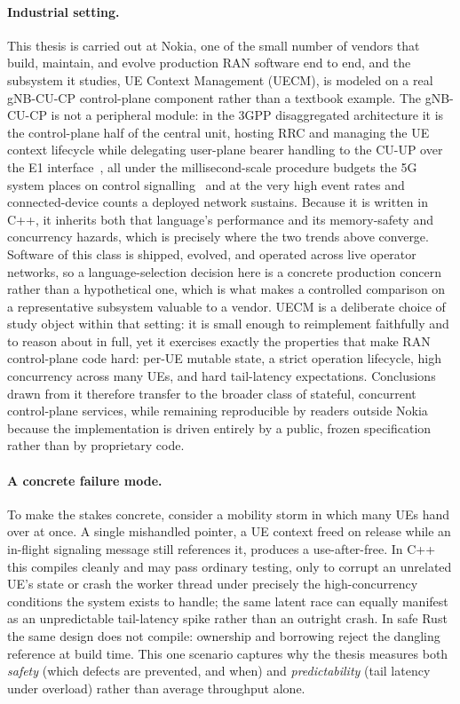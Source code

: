 \documentclass[english,twoside,openright,a4paper,censored,csm,software-track-2020]{HYthesisML}
\begin{document}
\paragraph{Industrial setting.}
This thesis is carried out at Nokia, one of the small number of vendors that build, maintain,
and evolve production RAN software end to end, and the subsystem it studies, UE Context
Management (UECM), is modeled on a real gNB-CU-CP control-plane component rather than a
textbook example. The gNB-CU-CP is not a peripheral module: in the 3GPP disaggregated
architecture it is the control-plane half of the central unit, hosting RRC and managing the
UE context lifecycle while delegating user-plane bearer handling to the CU-UP over the E1
interface~\cite{3gpp38401,3gpp38300,3gpp38463,3gpp38331}, all under the millisecond-scale
procedure budgets the 5G system places on control signalling~\cite{3gpp22261} and at the very
high event rates and connected-device counts a deployed network sustains. Because it is
written in C++, it inherits both that language's performance and its memory-safety and
concurrency hazards, which is precisely where the two trends above converge. Software of
this class is shipped, evolved, and operated across live operator networks, so a
language-selection decision here is a concrete production concern rather than a hypothetical
one, which is what makes a controlled comparison on a representative subsystem valuable to a
vendor. UECM is a deliberate choice of study object within that setting: it is small enough to
reimplement faithfully and to reason about in full, yet it exercises exactly the properties
that make RAN control-plane code hard: per-UE mutable state, a strict operation lifecycle,
high concurrency across many UEs, and hard tail-latency expectations. Conclusions drawn from
it therefore transfer to the broader class of stateful, concurrent control-plane services,
while remaining reproducible by readers outside Nokia because the implementation is driven
entirely by a public, frozen specification rather than by proprietary code.

\paragraph{A concrete failure mode.}
To make the stakes concrete, consider a mobility storm in which many UEs hand over at once. A
single mishandled pointer, a UE context freed on release while an in-flight signaling message
still references it, produces a use-after-free. In C++ this compiles cleanly and may pass
ordinary testing, only to corrupt an unrelated UE's state or crash the worker thread under
precisely the high-concurrency conditions the system exists to handle; the same latent race
can equally manifest as an unpredictable tail-latency spike rather than an outright crash. In
safe Rust the same design does not compile: ownership and borrowing reject the dangling
reference at build time. This one scenario captures why the thesis measures both
\emph{safety} (which defects are prevented, and when) and \emph{predictability} (tail
latency under overload) rather than average throughput alone.
\end{document}
